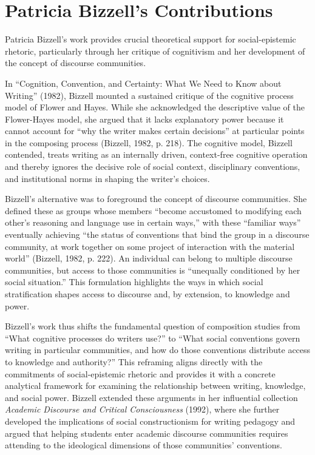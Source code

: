 \documentclass[12pt]{article}
\begin{document}
\section{Patricia Bizzell's Contributions}

Patricia Bizzell's work provides crucial theoretical support for social-epistemic rhetoric, particularly through her critique of cognitivism and her development of the concept of discourse communities.

In ``Cognition, Convention, and Certainty: What We Need to Know about Writing'' (1982), Bizzell mounted a sustained critique of the cognitive process model of Flower and Hayes. While she acknowledged the descriptive value of the Flower-Hayes model, she argued that it lacks explanatory power because it cannot account for ``why the writer makes certain decisions'' at particular points in the composing process (Bizzell, 1982, p. 218). The cognitive model, Bizzell contended, treats writing as an internally driven, context-free cognitive operation and thereby ignores the decisive role of social context, disciplinary conventions, and institutional norms in shaping the writer's choices.

Bizzell's alternative was to foreground the concept of discourse communities. She defined these as groups whose members ``become accustomed to modifying each other's reasoning and language use in certain ways,'' with these ``familiar ways'' eventually achieving ``the status of conventions that bind the group in a discourse community, at work together on some project of interaction with the material world'' (Bizzell, 1982, p. 222). An individual can belong to multiple discourse communities, but access to those communities is ``unequally conditioned by her social situation.'' This formulation highlights the ways in which social stratification shapes access to discourse and, by extension, to knowledge and power.

Bizzell's work thus shifts the fundamental question of composition studies from ``What cognitive processes do writers use?'' to ``What social conventions govern writing in particular communities, and how do those conventions distribute access to knowledge and authority?'' This reframing aligns directly with the commitments of social-epistemic rhetoric and provides it with a concrete analytical framework for examining the relationship between writing, knowledge, and social power. Bizzell extended these arguments in her influential collection \textit{Academic Discourse and Critical Consciousness} (1992), where she further developed the implications of social constructionism for writing pedagogy and argued that helping students enter academic discourse communities requires attending to the ideological dimensions of those communities' conventions.
\end{document}
